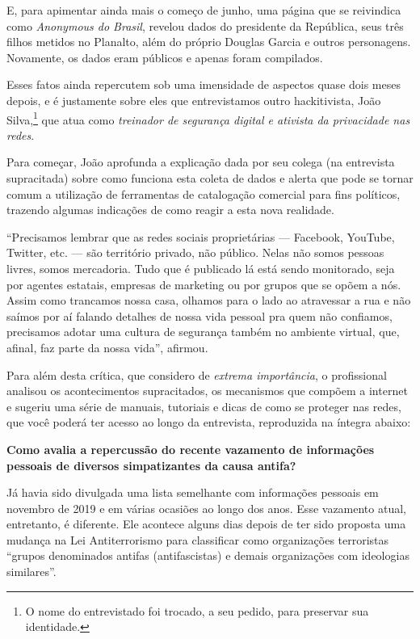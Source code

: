 E, para apimentar ainda mais o começo de junho, uma página que se
reivindica como \emph{Anonymous do Brasil}, revelou dados do presidente
da República, seus três filhos metidos no Planalto, além do próprio
Douglas Garcia e outros personagens. Novamente, os dados eram públicos e
apenas foram compilados.

Esses fatos ainda repercutem sob uma imensidade de aspectos quase dois
meses depois, e é justamente sobre eles que entrevistamos outro
hackitivista, João Silva,\footnote{O nome do entrevistado foi trocado, a seu pedido, para preservar sua identidade.} que atua como \emph{treinador de
segurança digital e ativista da privacidade nas redes}.

Para começar, João aprofunda a explicação dada por seu colega (na
entrevista supracitada) sobre como funciona esta coleta de dados e
alerta que pode se tornar comum a utilização de ferramentas de
catalogação comercial para fins políticos, trazendo algumas indicações
de como reagir a esta nova realidade.

``Precisamos lembrar que as redes sociais proprietárias --- Facebook,
YouTube, Twitter, etc. --- são território privado, não público. Nelas não
somos pessoas livres, somos mercadoria. Tudo que é publicado lá está
sendo monitorado, seja por agentes estatais, empresas de marketing ou
por grupos que se opõem a nós. Assim como trancamos nossa casa, olhamos
para o lado ao atravessar a rua e não saímos por aí falando detalhes de
nossa vida pessoal pra quem não confiamos, precisamos adotar uma cultura
de segurança também no ambiente virtual, que, afinal, faz parte da nossa
vida'', afirmou.

Para além desta crítica, que considero de \emph{extrema importância},
o profissional analisou os acontecimentos supracitados, os mecanismos
que compõem a internet e sugeriu uma série de manuais, tutoriais e dicas
de como se proteger nas redes, que você poderá ter acesso ao longo da
entrevista, reproduzida na íntegra abaixo:

\pagebreak

\noindent{}\textbf{Como avalia a repercussão do recente vazamento de informações
pessoais de diversos simpatizantes da causa antifa? }

Já havia sido divulgada uma lista semelhante com
informações pessoais em novembro de 2019 e em várias ocasiões ao longo
dos anos. Esse vazamento atual, entretanto, é diferente. Ele acontece
alguns dias depois de ter sido proposta uma mudança na Lei
Antiterrorismo para classificar como organizações terroristas ``grupos
denominados antifas (antifascistas) e demais organizações com ideologias
similares''.

